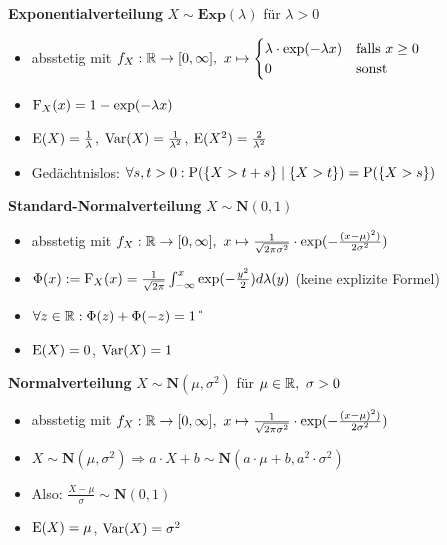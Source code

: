 \textbf{Exponentialverteilung} $X\sim\mathbf{Exp}(\lambda)$ für $\lambda>0$
\begin{itemize}
\item absstetig mit
$f_X:\R\to [0,\infty],\ x\mapsto\begin{cases}
\lambda\cdot\exp(-\lambda x) 	& \text{falls } x\geq 0	\\
0							& \text{sonst }		
\end{cases}$

\item $\F_X(x)=1-\exp(-\lambda x)$

\item $\E(X)=\frac{1}{\lambda}$, $\Var(X)=\frac{1}{\lambda^2}$,
$\E(X^2)=\frac{2}{\lambda^2}$

\item Gedächtnislos: $\forall s,t>0:\P(\{X>t+s\}\mid\{X>t\})=\P(\{X>s\})$\\
\end{itemize}

\textbf{Standard-Normalverteilung} $X\sim\mathbf{N}(0,1)$
\begin{itemize}
\item absstetig mit $f_X:\R\to[0,\infty],\
x\mapsto\frac{1}{\sqrt{2\pi\sigma^2}}\cdot\exp(-\frac{(x-\mu)^2)}{2\sigma^2})$

\item $\Phi(x):=\F_X(x)=
\frac{1}{\sqrt{2\pi}}\int_{-\infty}^{x}\exp(-\frac{y^2}{2})d\lambda(y)$
(keine explizite Formel)

\item $\forall z\in\R:\Phi(z)+\Phi(-z)=1$ \U

\item $\E(X)=0$, $\Var(X)=1$

\end{itemize}

\textbf{Normalverteilung} $X\sim\mathbf{N}(\mu,\sigma^2)$ für 
$\mu\in\R,\ \sigma>0$
\begin{itemize}
\item absstetig mit $f_X:\R\to[0,\infty],\ 
x\mapsto\frac{1}{\sqrt{2\pi\sigma^2}}\cdot\exp(-\frac{(x-\mu)^2)}{2\sigma^2})$

\item $X\sim\mathbf{N}(\mu,\sigma^2)
\Rightarrow a\cdot X+b\sim\mathbf{N}(a\cdot\mu+b,a^2\cdot\sigma^2)$

\item Also: $\frac{X-\mu}{\sigma}\sim\mathbf{N}(0,1)$

\item $\E(X)=\mu$, $\Var(X)=\sigma^2$
\end{itemize}


